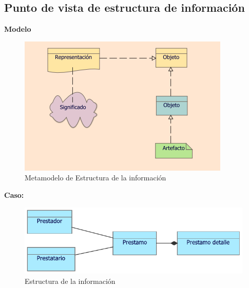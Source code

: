 	\subsection{Punto de vista de estructura de información}
	{		
		\textbf{Modelo}\\
		\begin{figure}[H]
			\centering
			\includegraphics[width=0.8\linewidth]{development/estructurainfo.png}
			\caption{Metamodelo de Estructura de la información}
		\end{figure}
		
		\textbf{Caso:} 
		
		\begin{figure}[H]
			\centering
			\includegraphics[width=0.8\linewidth]{development/estructurainfo.pdf}
			\caption{Estructura de la información}
		\end{figure}
	}
	
